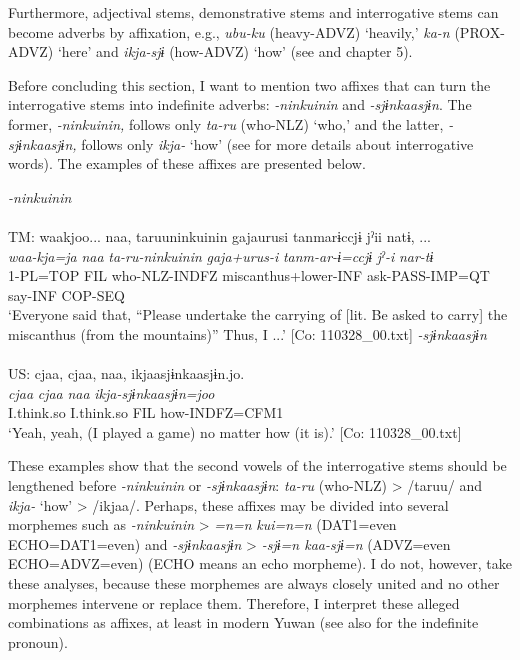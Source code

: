 Furthermore, adjectival stems, demonstrative stems and interrogative stems can become adverbs by affixation, e.g., \textit{ubu-ku} (heavy-ADVZ) ‘heavily,’ \textit{ka-n} (PROX-ADVZ) ‘here’ and \textit{ikja-sjɨ} (how-ADVZ) ‘how’ (see  and chapter 5).

Before concluding this section, I want to mention two affixes that can turn the interrogative stems into indefinite adverbs: \textit{{}-ninkuinin} and \textit{{}-sjɨnkaasjɨn}. The former, \textit{{}-ninkuinin,} follows only \textit{ta-ru} (who-NLZ) ‘who,’ and the latter, \textit{{}-sjɨnkaasjɨn,} follows only \textit{ikja-} ‘how’ (see  for more details about interrogative words). The examples of these affixes are presented below.

\ea  \label{ex:4.55}
\ea  \textit{{}-ninkuinin} \label{ex:4.55a}\\\\
    TM:  
     \glll waakjoo...  naa,  taruuninkuinin  gajaurusi   tanmarɨccjɨ  jˀii  natɨ, ...\\
      \textit{waa-kja=ja}  \textit{naa}  \textit{ta-ru-ninkuinin}  \textit{gaja+urus-i} \textit{tanm-ar-ɨ=ccjɨ}  \textit{jˀ-i}  \textit{nar-tɨ}\\                                                                                        
      1-PL=TOP  FIL  who-NLZ-INDFZ  miscanthus+lower-INF                                ask-PASS-IMP=QT  say-INF  COP-SEQ\\
      \glt ‘Everyone said that, “Please undertake the carrying of [lit. Be asked to carry] the miscanthus (from the mountains)” Thus, I ...’   [Co: 110328\_00.txt]
\ex  \textit{{}-sjɨnkaasjɨn}\\\\
US: \glll     cjaa,  cjaa,  naa,  ikjaasjɨnkaasjɨn.jo.\\
      \textit{cjaa}  \textit{cjaa}  \textit{naa}  \textit{ikja-sjɨnkaasjɨn=joo}\\
      I.think.so  I.think.so  FIL  how-INDFZ=CFM1\\
      \glt       ‘Yeah, yeah, (I played a game) no matter how (it is).’ [Co: 110328\_00.txt]
    \z
\z

These examples show that the second vowels of the interrogative stems should be lengthened before \textit{{}-ninkuinin} or \textit{{}-sjɨnkaasjɨn}: \textit{ta-ru} (who-NLZ) > /taruu/ and \textit{ikja-} ‘how’ > /ikjaa/. Perhaps, these affixes may be divided into several morphemes such as \textit{{}-ninkuinin} > \textit{=n=n} \textit{kui=n=n} (DAT1=even ECHO=DAT1=even) and \textit{{}-sjɨnkaasjɨn} > \textit{{}-sjɨ=n kaa-sjɨ=n} (ADVZ=even ECHO=ADVZ=even) (ECHO means an echo morpheme). I do not, however, take these analyses, because these morphemes are always closely united and no other morphemes intervene or replace them. Therefore, I interpret these alleged combinations as affixes, at least in modern Yuwan (see also  for the indefinite pronoun).

